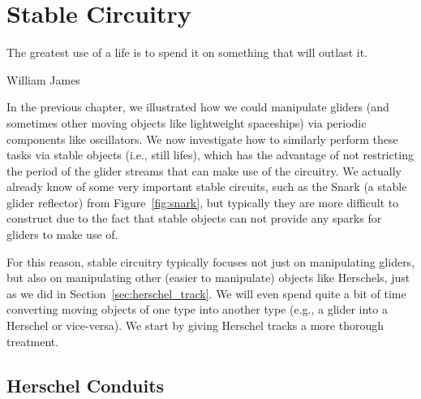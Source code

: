 

\renewcommand{\chapterfolder}{stationary_circuitry/}

\chapter{Stable Circuitry}\label{chp:stationary_circuitry}


\vspace*{-0.4in}
\epigraph{The greatest use of a life is to spend it on something that will outlast it.}{William James}
\vspace*{0.4in}


\noindent In the previous chapter, we illustrated how we could manipulate gliders (and sometimes other moving objects like lightweight spaceships) via periodic components like oscillators. We now investigate how to similarly perform these tasks via stable objects (i.e., still lifes), which has the advantage of not restricting the period of the glider streams that can make use of the circuitry. We actually already know of some very important stable circuits, such as the Snark (a stable glider reflector) from Figure~\ref{fig:snark}, but typically they are more difficult to construct due to the fact that stable objects can not provide any sparks for gliders to make use of.

For this reason, stable circuitry typically focuses not just on manipulating gliders, but also on manipulating other (easier to manipulate) objects like Herschels, just as we did in Section~\ref{sec:herschel_track}. We will even spend quite a bit of time converting moving objects of one type into another type (e.g., a glider into a Herschel or vice-versa). We start by giving Herschel tracks a more thorough treatment.


\section{Herschel Conduits}\label{sec:conduits}

